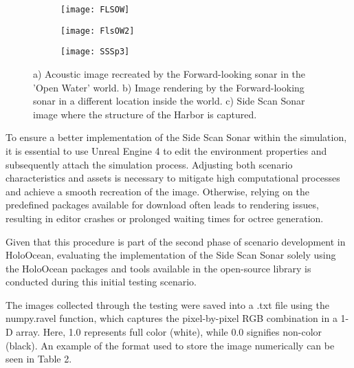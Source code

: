 \documentclass[]{article}
\begin{document}
	\newpage
	
	\begin{figure}[H]
		\begin{subfigure}{.32\textwidth}
			\centering
			\texttt{[image: FLSOW]}
			\caption{}
		\end{subfigure}
		\begin{subfigure}{.32\textwidth}
			\centering
			\texttt{[image: FlsOW2]}
			\caption{}
		\end{subfigure}
		\begin{subfigure}{.32\textwidth}
			\centering
			\texttt{[image: SSSp3]}
			\caption{}
		\end{subfigure}
		\caption{a) Acoustic image recreated by the Forward-looking sonar in the 'Open Water' world. b) Image rendering by the Forward-looking sonar in a different location inside the world. c) Side Scan Sonar image where the structure of the Harbor is captured.}
	\end{figure}
	
	To ensure a better implementation of the Side Scan Sonar within the simulation, it is essential to use Unreal Engine 4 to edit the environment properties and subsequently attach the simulation process. Adjusting both scenario characteristics and assets is necessary to mitigate high computational processes and achieve a smooth recreation of the image. Otherwise, relying on the predefined packages available for download often leads to rendering issues, resulting in editor crashes or prolonged waiting times for octree generation. 
	
	Given that this procedure is part of the second phase of scenario development in HoloOcean, evaluating the implementation of the Side Scan Sonar solely using the HoloOcean packages and tools available in the open-source library is conducted during this initial testing scenario.
	
	The images collected through the testing were saved into a .txt file using the numpy.ravel function, which captures the pixel-by-pixel RGB combination in a 1-D array. Here, 1.0 represents full color (white), while 0.0 signifies non-color (black). An example of the format used to store the image numerically can be seen in Table 2.
		
\end{document}
